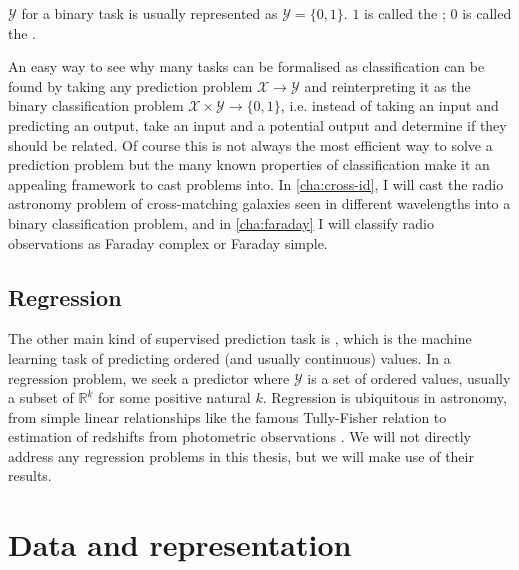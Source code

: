         $\mathcal Y$ for a binary task is usually represented as $\mathcal Y = \{0, 1\}$. $1$ is called the ; $0$ is called the .

        An easy way to see why many tasks can be formalised as classification can be found by taking any prediction problem $\mathcal X \to \mathcal Y$ and reinterpreting it as the binary classification problem $\mathcal X \times \mathcal Y \to \{0, 1\}$, i.e. instead of taking an input and predicting an output, take an input and a potential output and determine if they should be related. Of course this is not always the most efficient way to solve a prediction problem but the many known properties of classification make it an appealing framework to cast problems into. In \autoref{cha:cross-id}, I will cast the radio astronomy problem of cross-matching galaxies seen in different wavelengths into a binary classification problem, and in \autoref{cha:faraday} I will classify radio observations as Faraday complex or Faraday simple.


    \subsection{Regression}
    \label{sec:regression}
 
        The other main kind of supervised prediction task is , which is the machine learning task of predicting ordered (and usually continuous) values. In a regression problem, we seek a predictor where $\mathcal Y$ is a set of ordered values, usually a subset of $\mathbb R^k$ for some positive natural $k$. Regression is ubiquitous in astronomy, from simple linear relationships like the famous Tully-Fisher relation \citep{tully_new_1977} to estimation of redshifts from photometric observations \citep[called ; first introduced by]{baum_photoelectric_1962}. We will not directly address any regression problems in this thesis, but we will make use of their results.

\section{Data and representation}
\label{sec:data-and-representation}

